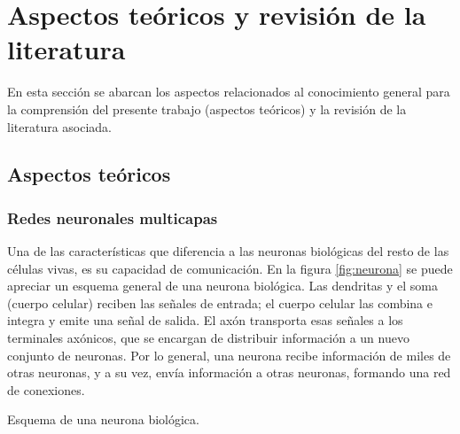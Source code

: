 \chapter{Aspectos teóricos y revisión de la literatura}

En esta sección se abarcan los aspectos relacionados al conocimiento general para la comprensión del presente trabajo (aspectos teóricos) y la revisión de la literatura asociada.%




\section{Aspectos teóricos}
\subsection{Redes neuronales multicapas}
Una de las características que diferencia a las neuronas biológicas del resto de las células vivas, es su capacidad de comunicación. En la figura \ref{fig:neurona} se puede apreciar un esquema general de una neurona biológica. Las dendritas y el soma (cuerpo celular) reciben las señales de entrada; el cuerpo celular las combina e integra y emite una señal de salida. El axón transporta esas señales a los terminales axónicos, que se encargan de distribuir información a un nuevo conjunto de neuronas. Por lo general, una neurona recibe información de miles de otras neuronas, y a su vez, envía información a otras neuronas, formando una red de conexiones.
\begin{imagen}
	\scalebox{0.07}{}
	\caption{Esquema de una neurona biológica.}
	\label{fig:neurona}
\end{imagen}

